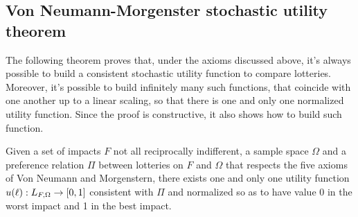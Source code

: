 \subsection{Von Neumann-Morgenster stochastic utility theorem}

The following theorem proves that, under the axioms discussed above, it's always possible to build a consistent stochastic utility function to compare lotteries. Moreover, it's possible to build infinitely many such functions, that coincide with one another up to a linear scaling, so that there is one and only one normalized utility function. Since the proof is constructive, it also shows how to build such function. \\

\begin{theo}
	Given a set of impacts $F$ not all reciprocally indifferent, a sample space $\Omega$ and a preference relation $\Pi$ between lotteries on $F$ and $\Omega$ that respects the five axioms of Von Neumann and Morgenstern, there exists one and only one utility function $u (\ell): L_{F, \Omega} \rightarrow [0,1]$ consistent with $\Pi$ and normalized so as to have value 0 in the worst impact and 1 in the best impact.
\end{theo}

